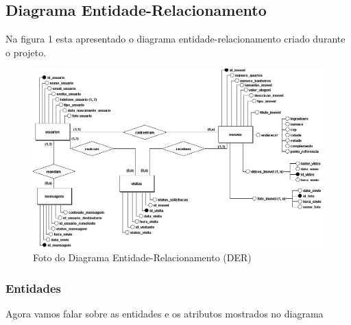 \subsection{Diagrama Entidade-Relacionamento}

Na figura 1 esta apresentado o diagrama entidade-relacionamento criado durante o projeto.
\newpage
\begin{figure}[h!] 
    \centering
    \includegraphics[width=\textwidth]{./img/Conceitual.png}
    
    \caption{Foto do Diagrama Entidade-Relacionamento (DER)}
    \label{fig:exemplo-imagem}
\end{figure}

\subsubsection{Entidades}
Agora vamos falar sobre as entidades e os atributos mostrados no diagrama\\


\setlength{\extrarowheight}{5pt} 

